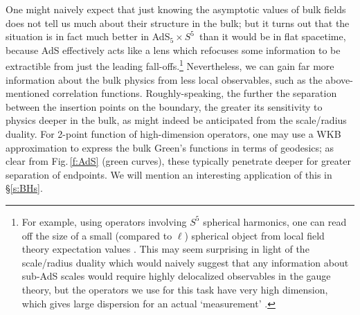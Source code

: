 \documentclass[12pt]{article}
\def\sect#1{\S\ref{#1}}
\def\fig#1{Fig.\,\ref{#1}}
\def\GT{gauge theory}
\def\adss#1#2{AdS$_{#1} \times S^{#2}$}
\def\Rads{\ell}
\begin{document}
One might naively expect that just knowing the asymptotic values of bulk fields does not tell us much about their structure in the bulk; but it turns out that the situation is in fact much better in \adss55\ than it would be in flat spacetime, because AdS effectively acts like a lens which refocuses some information to be extractible from just the leading fall-offs.\footnote{
For example, using operators involving $S^5$ spherical harmonics, one can read off the size of a small  (compared to $\Rads$) spherical object from local field theory expectation values
\cite{Horowitz:2000fm}.
This may seem surprising in light of the scale/radius duality which would naively suggest that any information about sub-AdS scales would require highly delocalized observables in the \GT, but the operators we use for this task have very high dimension, which gives large dispersion for an actual `measurement' \cite{Hubeny:2000eu}.
}
Nevertheless, we can gain far more information about the bulk physics from less local observables, such as the above-mentioned correlation functions.  Roughly-speaking, the further the separation between the insertion points on the boundary, the greater its sensitivity to physics deeper in the bulk, as might indeed be anticipated from the scale/radius duality.  For 2-point function of high-dimension operators, one may use a WKB approximation to express the bulk Green's functions in terms of geodesics; as clear from \fig{f:AdS} (green curves), these typically penetrate deeper for greater separation of endpoints.
We will mention an interesting application of this in \sect{s:BHs}.
\end{document}
